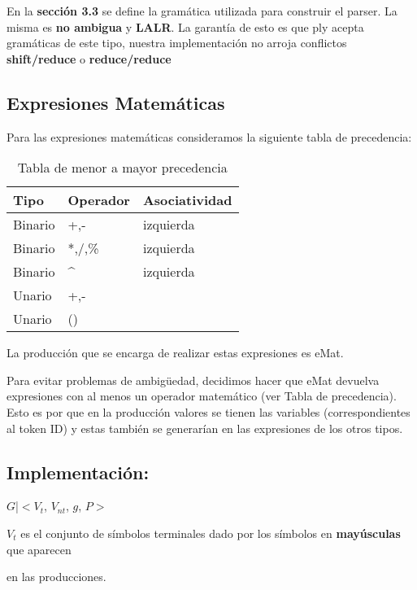 \documentclass[10pt, a4paper]{article}
\begin{document}
En  la \textbf{sección 3.3}  se define la gramática utilizada para construir el parser. La misma es \textbf{no ambigua} y \textbf{LALR}. La garantía de esto es que ply acepta gramáticas de este tipo, nuestra implementación no arroja conflictos \textbf{shift/reduce} o \textbf{reduce/reduce} \\

\subsection{Expresiones Matemáticas}
Para las expresiones matemáticas consideramos la siguiente tabla de precedencia:

\begin{table}[htbp]
\begin{center}
\begin{tabular}{|l|l|l|}
\hline
Tipo & Operador & Asociatividad \\
\hline \hline
Binario & +,- & izquierda \\ \hline
Binario & *,/,\% & izquierda \\ \hline
Binario & \^{} & izquierda \\ \hline
Unario & +,- &  \\ \hline
Unario & () &  \\ \hline

\end{tabular}
\caption{Tabla de menor a mayor precedencia}
\label{Precedencia}
\end{center}
\end{table}

La producción que se encarga de realizar estas expresiones es eMat.

Para evitar problemas de ambigüedad, decidimos hacer que eMat devuelva expresiones con al menos un operador matemático (ver Tabla de precedencia). Esto es por que en la producción valores se tienen las variables (correspondientes al token ID) y estas
también se generarían en las expresiones de los otros tipos.

\subsection{Implementación:}
\linespread{1.125}\selectfont

$G$|$<V_{t}$, $V_{nt}$, $g$, $P>$

$V_{t}$ es el conjunto de símbolos terminales dado por los símbolos en \textbf{mayúsculas} que aparecen 

en las producciones.
\end{document}
